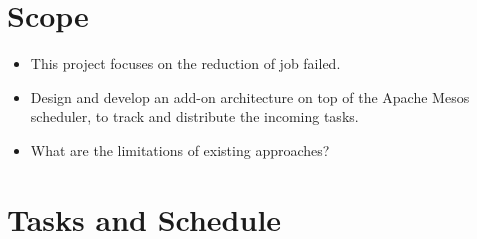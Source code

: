\documentclass[12pt,oneside,openright,a4paper]{cpe-english-project}
\begin{document}
\section{Scope}
\begin{itemize}
  \item  This project focuses on the reduction of job failed. 
  \item  Design and develop an add-on architecture on top of the Apache Mesos scheduler, to track and distribute the incoming tasks.
  \item  What are the limitations of existing approaches? 
\end{itemize}

\newpage

\section{Tasks and Schedule}
\end{document}
